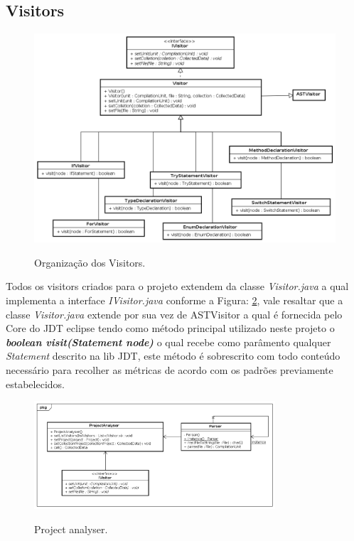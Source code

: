 \subsection{Visitors}
\begin{figure}[h]
\center
\includegraphics[width=1.0\textwidth]{Imagens/Visitors}
\label{fig:arqVisitor}
\caption{Organização dos Visitors.}
\end{figure}

Todos os visitors criados para o projeto extendem da classe \textit{Visitor.java} a qual implementa a interface \textit{IVisitor.java} conforme a Figura: \ref{fig:ProjectAnalyser}, vale resaltar que a classe \textit{Visitor.java} extende por sua vez de ASTVisitor a qual é fornecida pelo Core do JDT eclipse tendo como método principal utilizado neste projeto o \textbf{{\it boolean visit(Statement node)}} o qual recebe como parâmento qualquer {\it Statement} descrito na lib JDT, este método é sobrescrito com todo conteúdo necessário para recolher as métricas de acordo com os padrões previamente estabelecidos.\\
\clearpage
\begin{figure}[h]
	\center
	\includegraphics[width=0.8\textwidth]{Imagens/ProjectAnalyser}
	\label{fig:ProjectAnalyser}
	\caption{Project analyser.}
\end{figure}

